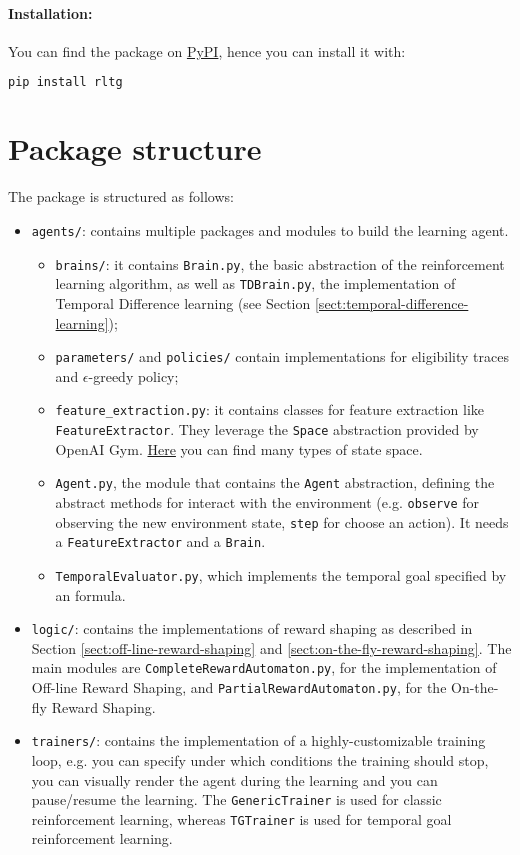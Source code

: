 \paragraph{Installation:} You can find the package on \href{https://pypi.org/project/rltg/}{PyPI}, hence you can install it with:
\begin{lstlisting}[language=bash]
pip install rltg
\end{lstlisting}

\section{Package structure}
The package is structured as follows:
\begin{itemize}
	\item \texttt{agents/}: contains multiple packages and modules to build the learning agent.
	\begin{itemize}
		\item \texttt{brains/}: it contains \texttt{Brain.py}, the basic abstraction of the reinforcement learning algorithm, as well as \texttt{TDBrain.py}, the implementation of Temporal Difference learning (see Section \ref{sect:temporal-difference-learning});
		\item \texttt{parameters/} and \texttt{policies/} contain implementations for eligibility traces and $\epsilon$-greedy policy;
		\item \texttt{feature\_extraction.py}: it contains classes for feature extraction like \texttt{FeatureExtractor}. They leverage the \texttt{Space} abstraction provided by OpenAI Gym. \href{https://github.com/openai/gym/tree/master/gym/spaces}{Here} you can find many types of state space.
		\item \texttt{Agent.py}, the module that contains the \texttt{Agent} abstraction, defining the abstract methods for interact with the environment (e.g. \texttt{observe} for observing the new environment state, \texttt{step} for choose an action). It needs a \texttt{FeatureExtractor} and a \texttt{Brain}. 
		\item \texttt{TemporalEvaluator.py}, which implements the temporal goal specified by an \LLf formula.
	\end{itemize}
	\item \texttt{logic/}: contains the implementations of reward shaping as described in Section \ref{sect:off-line-reward-shaping} and \ref{sect:on-the-fly-reward-shaping}. The main modules are \texttt{CompleteRewardAutomaton.py}, for the implementation of Off-line Reward Shaping, and \texttt{PartialRewardAutomaton.py}, for the On-the-fly Reward Shaping.
	\item \texttt{trainers/}: contains the implementation of a highly-customizable training loop, e.g. you can specify under which conditions the training should stop, you can visually render the agent during the learning and you can pause/resume the learning. The \texttt{GenericTrainer} is used for classic reinforcement learning, whereas \texttt{TGTrainer} is used for temporal goal reinforcement learning.
\end{itemize}

